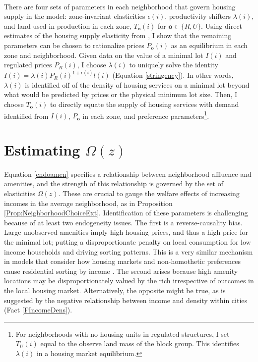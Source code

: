 \documentclass[12pt]{article}
\begin{document}
\paragraph*{}
There are four sets of parameters in each neighborhood that govern housing supply in the model:  zone-invariant elasticities $\epsilon(i)$, productivity shifters $\lambda(i)$, and land used in production in each zone, $T_{\boldsymbol{o}}(i)$ for $\boldsymbol{o} \in \{R, U\}$. Using direct estimates of the housing supply elasticity from \cite{BSH}, I show that the remaining parameters can be chosen to rationalize prices $P_{\boldsymbol{o}}(i)$ as an equilibrium in each zone and neighborhood. Given data on the value of a minimal lot $I(i)$ and regulated prices $P_{R}(i)$, I choose $\lambda(i)$ to uniquely solve the identity $I(i) = \lambda(i)P_{R}(i)^{1 + \epsilon(i)}l(i)$ (Equation \ref{stringency}). In other words, $\lambda(i)$ is identified off of the density of housing services on a minimal lot beyond what would be predicted by prices or the physical minimum lot size. Then, I choose $T_{\boldsymbol{o}}(i)$ to directly equate the supply of housing services with demand identified from $I(i)$, $P_{\boldsymbol{o}}$ in each zone, and preference parameters\footnote{For neighborhoods with no housing units in regulated structures, I set $T_{U}(i)$ equal to the observe land mass of the block group. This identifies $\lambda(i)$ in a housing market equilibrium.}. 






\section{Estimating $\Omega(z)$}\label{Section:EstNeighborhoodChoice}
\paragraph*{}
Equation \eqref{endoamen} specifies a relationship between neighborhood affluence and amenities, and the strength of this relationship is governed by the set of elasticities $\Omega(z)$. These are crucial to gauge the welfare effects of increasing incomes in the average neighborhood, as in Proposition \ref{Prop:NeighborhoodChoiceExt}. Identification of these parameters is challenging because of at least two endogeneity issues. The first is a reverse-causality bias. Large unobserved amenities imply high housing prices, and thus a high price for the minimal lot; putting a disproportionate penalty on local consumption for low income households and driving sorting patterns. This is a very similar mechanism in models that consider how housing markets and non-homothetic preferences cause residential sorting by income \citep{LeeandLin, Coutureetal}. The second arises because high amenity locations may be disproportionately valued by the rich irrespective of outcomes in the local housing market. Alternatively, the opposite might be true, as is suggested by the negative relationship between income and density within cities (Fact \ref{FIncomeDens}). 
\end{document}

